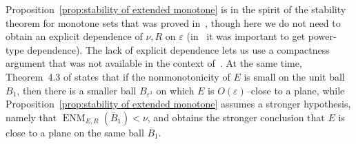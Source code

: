 \documentclass[11pt,reqno]{amsart}
\renewcommand{\epsilon}{\varepsilon}
\newcommand{\e}{\varepsilon}
\newcommand{\0}{\mathbf{0}}
\renewcommand{\1}{\mathbf 1}
\theoremstyle{remark}
\DeclareMathOperator{\ENM}{ENM}
\begin{document}
Proposition~\ref{prop:stability of extended monotone} is in the spirit of the stability theorem for monotone sets that was proved in~\cite{CKN}, though here we do not need to obtain an explicit dependence of $\nu,R$ on $\e$ (in~\cite{CKN} it was important to get power-type dependence).  The lack of explicit dependence lets us use a compactness argument that was not available in the context of~\cite{CKN}.  At the same time, Theorem~4.3 of \cite{CKN} states that if the nonmonotonicity of $E$ is small on the unit ball $B_1$, then there is a smaller ball $B_{\epsilon^3}$ on which $E$ is $O(\epsilon)$--close to a plane, while  Proposition~\ref{prop:stability of extended monotone} assumes a stronger hypothesis, namely that $\ENM_{E,R}(\overline{B}_1)<\nu$, and obtains the stronger conclusion that $E$ is close to a plane on the same ball $\overline{B}_1$.
\end{document}
